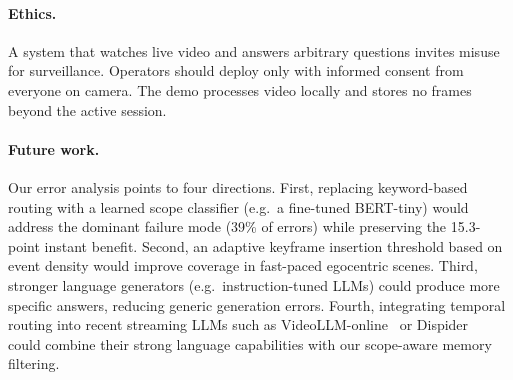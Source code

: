\paragraph{Ethics.}
A system that watches live video and answers arbitrary questions invites misuse for surveillance. Operators should deploy \ours only with informed consent from everyone on camera. The demo processes video locally and stores no frames beyond the active session.

\paragraph{Future work.}
Our error analysis points to four directions.
First, replacing keyword-based routing with a learned scope classifier (e.g.\ a fine-tuned BERT-tiny) would address the dominant failure mode (39\% of errors) while preserving the 15.3-point instant benefit.
Second, an adaptive keyframe insertion threshold based on event density would improve coverage in fast-paced egocentric scenes.
Third, stronger language generators (e.g.\ instruction-tuned LLMs) could produce more specific answers, reducing generic generation errors.
Fourth, integrating temporal routing into recent streaming LLMs such as VideoLLM-online~\cite{chen2024videollmonline} or Dispider~\cite{he2024dispider} could combine their strong language capabilities with our scope-aware memory filtering.
